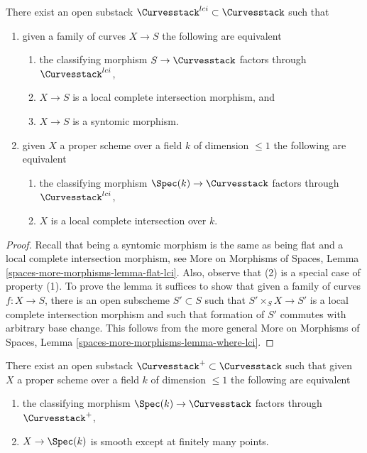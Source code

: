 \begin{lemma}
\label{lemma-lci-part-curves}
There exist an open substack $\Curvesstack^{lci} \subset \Curvesstack$
such that
\begin{enumerate}
\item given a family of curves $X \to S$ the following are equivalent
\begin{enumerate}
\item the classifying morphism $S \to \Curvesstack$ factors through
$\Curvesstack^{lci}$,
\item $X \to S$ is a local complete intersection morphism, and
\item $X \to S$ is a syntomic morphism.
\end{enumerate}
\item given $X$ a proper scheme over a field $k$ of dimension $\leq 1$
the following are equivalent
\begin{enumerate}
\item the classifying morphism $\Spec(k) \to \Curvesstack$ factors
through $\Curvesstack^{lci}$,
\item $X$ is a local complete intersection over $k$.
\end{enumerate}
\end{enumerate}
\end{lemma}

\begin{proof}
Recall that being a syntomic morphism is the same as being flat and
a local complete intersection morphism, see
More on Morphisms of Spaces, Lemma \ref{spaces-more-morphisms-lemma-flat-lci}.
Also, observe that (2) is a special case of property (1).
To prove the lemma it suffices to show that given a family of curves
$f : X \to S$, there is an open subscheme $S' \subset S$
such that $S' \times_S X \to S'$ is a local complete intersection
morphism and such that formation of $S'$ commutes with arbitrary base change.
This follows from the more general
More on Morphisms of Spaces, Lemma \ref{spaces-more-morphisms-lemma-where-lci}.
\end{proof}

\begin{lemma}
\label{lemma-isolated-part-curves}
There exist an open substack
$\Curvesstack^{+} \subset \Curvesstack$
such that given $X$ a proper scheme over a field $k$ of dimension $\leq 1$
the following are equivalent
\begin{enumerate}
\item the classifying morphism $\Spec(k) \to \Curvesstack$ factors
through $\Curvesstack^{+}$,
\item $X \to \Spec(k)$ is smooth except at finitely many points.
\end{enumerate}
\end{lemma}

